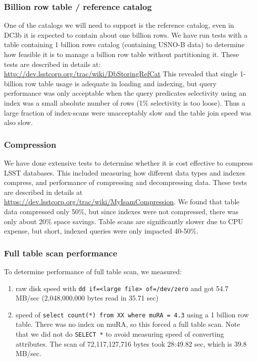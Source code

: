 \documentclass[DM,lsstdraft,toc]{lsstdoc}
\begin{document}
\subsubsection{Billion row table / reference
catalog}\label{billion-row-table-reference-catalog}

One of the catalogs we will need to support is the reference catalog,
even in DC3b it is expected to contain about one billion rows. We have
run tests with a table containing 1 billion rows catalog (containing
USNO-B data) to determine how feasible it is to manage a billion row
table without partitioning it. These tests are described in details at:
\url{http://dev.lsstcorp.org/trac/wiki/DbStoringRefCat} This revealed
that single 1-billion row table usage is adequate in loading and
indexing, but query performance was only acceptable when the query
predicates selectivity using an index was a small absolute number of
rows (1\% selectivity is too loose). Thus a large fraction of
index-scans were unacceptably slow and the table join speed was also
slow.

\subsubsection{Compression}\label{compression}

We have done extensive tests to determine whether it is cost effective
to compress LSST databases. This included measuring how different data
types and indexes compress, and performance of compressing and
decompressing data. These tests are described in details at
\url{https://dev.lsstcorp.org/trac/wiki/MyIsamCompression}. We found
that table data compressed only 50\%, but since indexes were not
compressed, there was only about 20\% space savings. Table scans are
significantly slower due to CPU expense, but short, indexed queries were
only impacted 40-50\%.

\subsubsection{Full table scan
performance}\label{full-table-scan-performance}

To determine performance of full table scan, we measured:

\begin{enumerate}
\def\labelenumi{\arabic{enumi}.}
\item
  raw disk speed with
  \texttt{dd\ if=\textless{}large\ file\textgreater{}\ of=/dev/zero} and
  got 54.7 MB/sec (2,048,000,000 bytes read in 35.71 sec)
\item
  speed of \texttt{select\ count(*)\ from\ XX\ where\ muRA\ =\ 4.3}
  using a 1 billion row table. There was no index on muRA, so this
  forced a full table scan. Note that we did not do \texttt{SELECT\ *}
  to avoid measuring speed of converting attributes. The scan of
  72,117,127,716 bytes took 28:49.82 sec, which is 39.8 MB/sec.
\end{enumerate}
\end{document}
